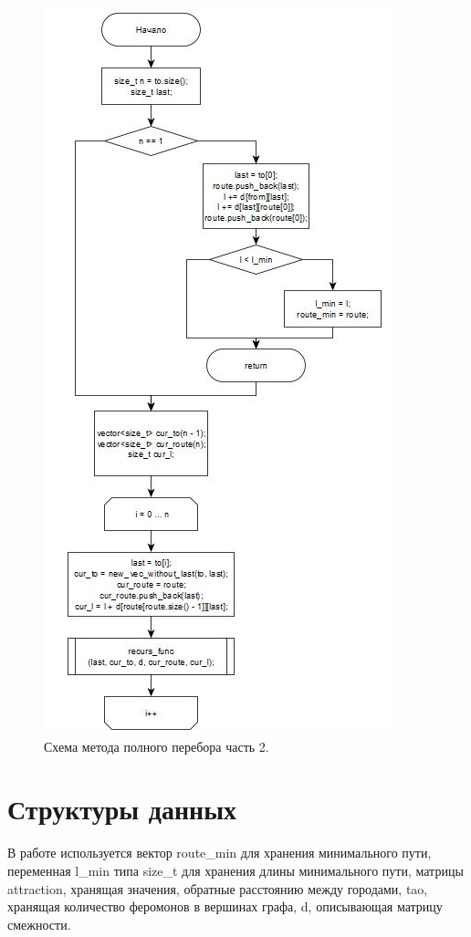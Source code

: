 \documentclass[a4paper,oneside,14pt]{extreport}
\begin{document}
\begin{figure}[H]
	\begin{center}
		\includegraphics[scale=1]{images/enumeration2.png}
		\caption{Схема метода полного перебора часть 2.}
		\label{fig:en2}
	\end{center}
\end{figure}

\section{Структуры данных}
В работе используется вектор route\_min для хранения минимального пути, переменная l\_min типа size\_t для хранения длины минимального пути, матрицы attraction, хранящая значения, обратные расстоянию между городами, tao, хранящая количество феромонов в вершинах графа, d, описывающая матрицу смежности.
\end{document}
